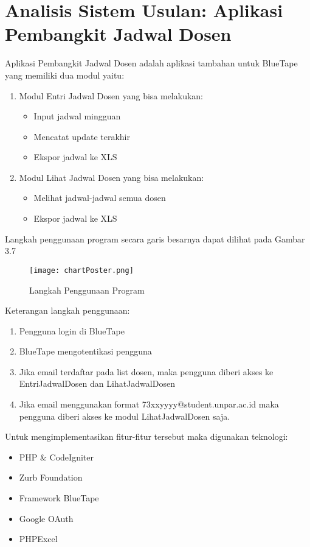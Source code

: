 \section{Analisis Sistem Usulan: Aplikasi Pembangkit Jadwal Dosen}
Aplikasi Pembangkit Jadwal Dosen adalah aplikasi tambahan untuk BlueTape yang memiliki dua modul yaitu:
\begin{enumerate}
	\item Modul Entri Jadwal Dosen yang bisa melakukan:
		\begin{itemize}
			\item Input jadwal mingguan
			\item Mencatat update terakhir
			\item Ekspor jadwal ke XLS
		\end{itemize}
	\item Modul Lihat Jadwal Dosen yang bisa melakukan:
		\begin{itemize}
			\item Melihat jadwal-jadwal semua dosen
			\item Ekspor jadwal ke XLS
		\end{itemize}
\end{enumerate}
Langkah penggunaan program secara garis besarnya dapat dilihat pada Gambar 3.7
\begin{figure} [H]
	\centering  
	\texttt{[image: chartPoster.png]}
	\caption[Langkah Penggunaan Program]{Langkah Penggunaan Program} 
	\label{fig:flow-chart-CodeIgniter} 
\end{figure}
Keterangan langkah penggunaan:
\begin{enumerate}
	\item Pengguna login di BlueTape
	\item BlueTape mengotentikasi pengguna
	\item Jika email terdaftar pada list dosen, maka pengguna diberi akses ke EntriJadwalDosen dan LihatJadwalDosen
	\item Jika email menggunakan format 73xxyyyy@student.unpar.ac.id maka pengguna diberi akses ke modul LihatJadwalDosen saja.
\end{enumerate}
Untuk mengimplementasikan fitur-fitur tersebut maka digunakan teknologi:
\begin{itemize}
	\item PHP \& CodeIgniter
	\item Zurb Foundation
	\item Framework BlueTape
	\item Google OAuth
	\item PHPExcel
\end{itemize}

